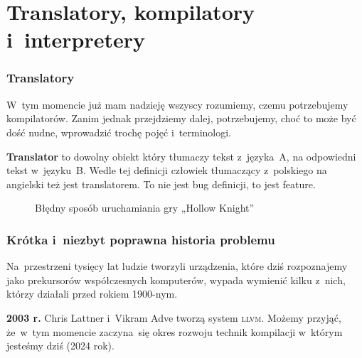 \documentclass[10pt,t]{beamer}
\begin{document}
\section{Translatory, kompilatory i~interpretery}



\begin{frame}
  \frametitle{Translatory}


  W~tym momencie już mam nadzieję wszyscy rozumiemy, czemu potrzebujemy
  kompilatorów. Zanim jednak przejdziemy dalej, potrzebujemy, choć to może
  być dość nudne, wprowadzić trochę pojęć i~terminologi.

  \textbf{Translator} to dowolny obiekt który tłumaczy tekst z~języka~A,
  na odpowiedni tekst w~języku~B. Wedle tej definicji człowiek tłumaczący
  z~polskiego na angielski też jest translatorem. To nie jest bug definicji,
  to jest feature.



  \begin{figure}

    \label{fig:Translator-02}



    \caption{Błędny sposób uruchamiania gry „Hollow Knight”}


  \end{figure}


\end{frame}










\begin{frame}
  \frametitle{Krótka i~niezbyt poprawna historia problemu}


  Na~przestrzeni tysięcy lat ludzie tworzyli urządzenia, które dziś
  rozpoznajemy jako prekursorów współczesnych komputerów, wypada wymienić
  kilku z~nich, którzy działali przed rokiem 1900-nym.

  \textbf{2003 r.} Chris Lattner i~Vikram Adve tworzą system \textsc{llvm}.
  Możemy przyjąć, że~w~tym momencie zaczyna~się okres rozwoju technik
  kompilacji w~którym jesteśmy dziś (2024 rok).

\end{frame}
\end{document}
